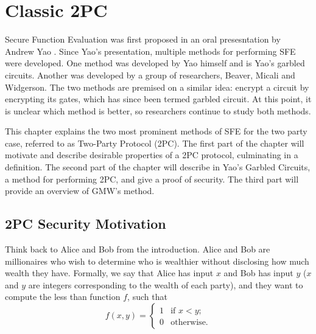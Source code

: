 
\chapter{Classic 2PC}
Secure Function Evaluation was first proposed in an oral presesntation by Andrew Yao \cite{yao-original}.
Since Yao's presentation, multiple methods for performing SFE were developed.
One method was developed by Yao himself and is Yao's garbled circuits.
Another was developed by a group of researchers, Beaver, Micali and Widgerson.
The two methods are premised on a similar idea: encrypt a circuit by encrypting its gates, which has since been termed garbled circuit.
At this point, it is unclear which method is better, so researchers continue to study both methods.

This chapter explains the two most prominent methods of SFE for the two party case, referred to as Two-Party Protocol (2PC).
The first part of the chapter will motivate and describe desirable properties of a 2PC protocol, culminating in a definition. 
The second part of the chapter will describe in Yao's Garbled Circuits, a method for performing 2PC, and give a proof of security. 
The third part will provide an overview of GMW's method.

\section{2PC Security Motivation}
Think back to Alice and Bob from the introduction. 
Alice and Bob are millionaires who wish to determine who is wealthier without disclosing how much wealth they have.
Formally, we say that Alice has input $x$ and Bob has input $y$ ($x$ and $y$ are integers corresponding to the wealth of each party), and they want to compute the less than function $f$, such that 
\begin{equation}
f(x,y) = \left\{
\begin{array}{lr}
    1 & \text{if } x < y \text{;} \\
    0 & \text{otherwise.}
\end{array}
\right.
\end{equation} 

